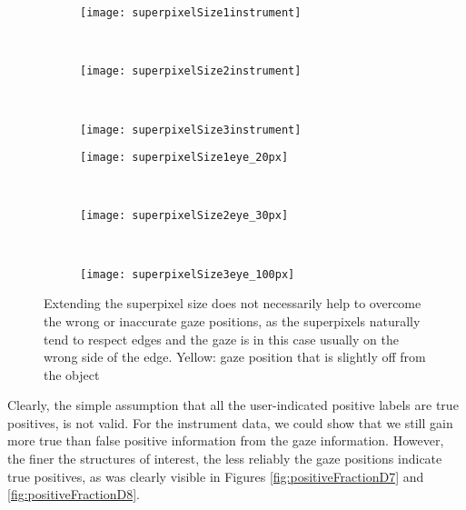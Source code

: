 \begin{figure}[ht]
	\centering
	\begin{subfigure}[h]{0.31\textwidth}
	      \texttt{[image: superpixelSize1instrument]}
	\end{subfigure}
	~
	\begin{subfigure}[h]{0.31\textwidth}
		\texttt{[image: superpixelSize2instrument]}	
	\end{subfigure}
	~
	\begin{subfigure}[h]{0.31\textwidth}
		\texttt{[image: superpixelSize3instrument]}	
	\end{subfigure}	
	
	\vspace{3mm}
	\begin{subfigure}[h]{0.31\textwidth}
	      \texttt{[image: superpixelSize1eye\_20px]}
	\end{subfigure}
	~
	\begin{subfigure}[h]{0.31\textwidth}
		\texttt{[image: superpixelSize2eye\_30px]}	
	\end{subfigure}
	~
	\begin{subfigure}[h]{0.31\textwidth}
		\texttt{[image: superpixelSize3eye\_100px]}	
	\end{subfigure}	
	\caption{Extending the superpixel size does not necessarily help to overcome the wrong or inaccurate gaze positions, as the superpixels naturally tend to respect edges and the gaze is in this case usually on the wrong side of the edge. Yellow: gaze position that is slightly off from the object}
	\label{fig:gazeOffSuperpixelSize}
\end{figure}


Clearly, the simple assumption that all the user-indicated positive labels are true positives, is not valid. 
For the instrument data, we could show that we still gain more true than false positive information from the gaze information. However, the finer the structures of interest, the less reliably the gaze positions indicate true positives, as was clearly visible in Figures \ref{fig:positiveFractionD7} and \ref{fig:positiveFractionD8}.